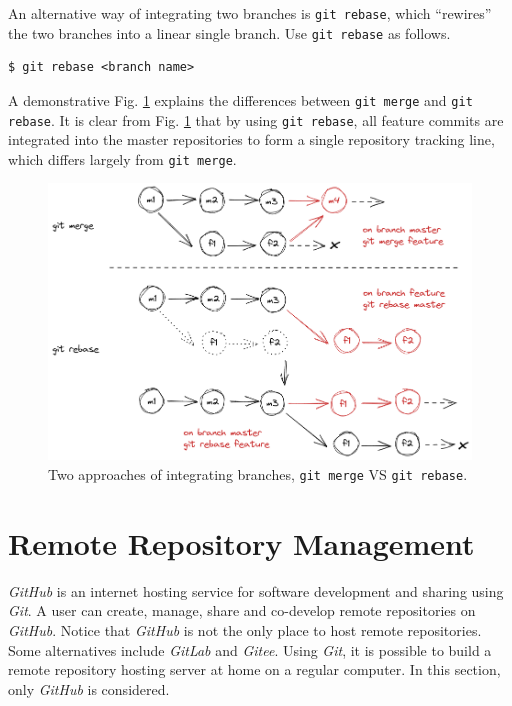 An alternative way of integrating two branches is \verb|git rebase|, which ``rewires'' the two branches into a linear single branch. Use \verb|git rebase| as follows.
\begin{lstlisting}
$ git rebase <branch name>
\end{lstlisting}
A demonstrative Fig. \ref{ch:sma:fig:gitrebase} explains the differences between \verb|git merge| and \verb|git rebase|. It is clear from Fig. \ref{ch:sma:fig:gitrebase} that by using \verb|git rebase|, all feature commits are integrated into the master repositories to form a single repository tracking line, which differs largely from \verb|git merge|.
\begin{figure}
	\centering
	\includegraphics[width=350pt]{chapters/ch-software-management-advanced/figures/gitrebase.png}
	\caption{Two approaches of integrating branches, \texttt{git merge} VS \texttt{git rebase}.} \label{ch:sma:fig:gitrebase}
\end{figure}

\section{Remote Repository Management} \label{ch:sma:sec:rrm}

\textit{GitHub} is an internet hosting service for software development and sharing using \textit{Git}. A user can create, manage, share and co-develop remote repositories on \textit{GitHub}. Notice that \textit{GitHub} is not the only place to host remote repositories. Some alternatives include \textit{GitLab} and \textit{Gitee}. Using \textit{Git}, it is possible to build a remote repository hosting server at home on a regular computer. In this section, only \textit{GitHub} is considered.

